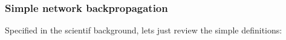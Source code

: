 \subsubsection{Simple network backpropagation}

Specified in the scientif background, lets just review the simple definitions:
